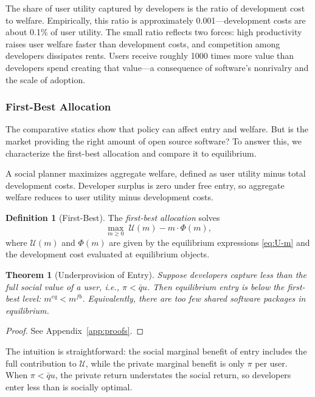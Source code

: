 \documentclass[11pt,a4paper]{article}
\newtheorem{theorem}{Theorem}
\theoremstyle{definition}
\newtheorem{definition}{Definition}
\theoremstyle{remark}
\begin{document}
The share of user utility captured by developers is the ratio of development cost to welfare. Empirically, this ratio is approximately 0.001---development costs are about 0.1\% of user utility. The small ratio reflects two forces: high productivity raises user welfare faster than development costs, and competition among developers dissipates rents. Users receive roughly 1000 times more value than developers spend creating that value---a consequence of software's nonrivalry and the scale of adoption.

\subsubsection{First-Best Allocation}\label{first-best-allocation}

The comparative statics show that policy can affect entry and welfare.
But is the market providing the right amount of open source software? To
answer this, we characterize the first-best allocation and compare it to
equilibrium.

A social planner maximizes aggregate welfare, defined as user utility
minus total development costs. Developer surplus is zero under free entry, so aggregate welfare reduces to user utility minus development costs.

\begin{definition}[First-Best]\label{def:first-best}
The \emph{first-best allocation} solves
$$
\max_{m \ge 0} \; \mathcal{U}(m) - m \cdot \Phi(m),
$$
where $\mathcal{U}(m)$ and $\Phi(m)$ are given by the equilibrium expressions \eqref{eq:U-m} and the development cost evaluated at equilibrium objects. 
\end{definition}

\begin{theorem}[Underprovision of Entry]\label{thm:underprovision-baseline}
Suppose developers capture less than the full social value of a user, i.e., $\pi < \bar{q} u$. Then equilibrium entry is below the first-best level: $m^{eq} < m^{fb}$. Equivalently, there are too few shared software packages in equilibrium.
\end{theorem}

\begin{proof}
See Appendix~\ref{app:proofs}.
\end{proof}

The intuition is straightforward: the social marginal benefit of entry
includes the full contribution to \(\mathcal{U}\), while the private
marginal benefit is only \(\pi\) per user. When \(\pi < \bar{q}u\), the
private return understates the social return, so developers enter less
than is socially optimal.
\end{document}
